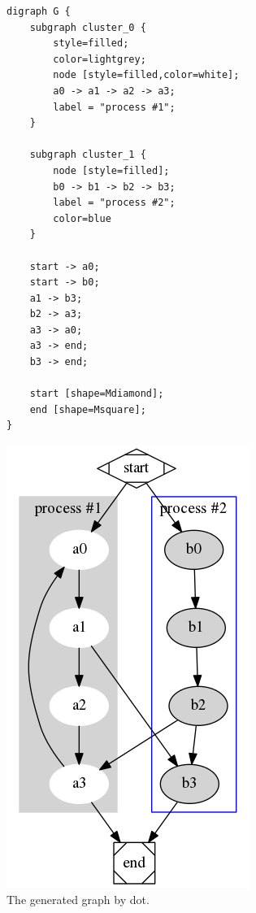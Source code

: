 \documentclass[a4paper]{report}
\begin{document}
\begin{figure}
\begin{minipage}{0.45\textwidth}
\begin{lstlisting}[caption=The code to create a graph, label=lst:Dot_Example]
digraph G {
	subgraph cluster_0 {
		style=filled;
		color=lightgrey;
		node [style=filled,color=white];
		a0 -> a1 -> a2 -> a3;
		label = "process #1";
	}

	subgraph cluster_1 {
		node [style=filled];
		b0 -> b1 -> b2 -> b3;
		label = "process #2";
		color=blue
	}
	
	start -> a0;
	start -> b0;
	a1 -> b3;
	b2 -> a3;
	a3 -> a0;
	a3 -> end;
	b3 -> end;

	start [shape=Mdiamond];
	end [shape=Msquare];
}
\end{lstlisting}
\end{minipage}\hfill
\begin{minipage}{0.45\textwidth}
\centering
\includegraphics[width=\linewidth]{images/AOFDot/SmallExample.png}
\caption{The generated graph by dot.}
\label{fig:Dot_Example}
\end{minipage}
\end{figure}
\end{document}
